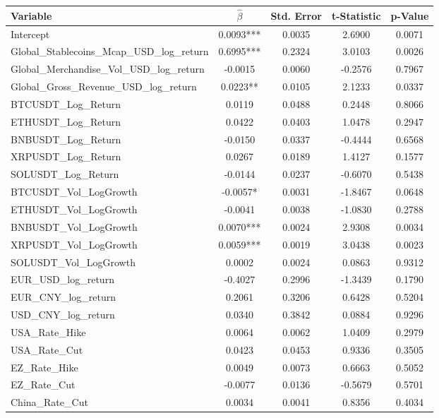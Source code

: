 {\renewcommand{\arraystretch}{0.90}
\begin{tabular}{lcccc}
  \toprule
  \textbf{Variable} & \textbf{$\hat{\beta}$} & \textbf{Std. Error} & \textbf{t-Statistic} & \textbf{p-Value} \\ 
  \midrule
  Intercept & 0.0093*** & 0.0035 & 2.6900 & 0.0071 \\ 
  Global\_Stablecoins\_Mcap\_USD\_log\_return & 0.6995*** & 0.2324 & 3.0103 & 0.0026 \\ 
  Global\_Merchandise\_Vol\_USD\_log\_return & -0.0015 & 0.0060 & -0.2576 & 0.7967 \\ 
  Global\_Gross\_Revenue\_USD\_log\_return & 0.0223** & 0.0105 & 2.1233 & 0.0337 \\ 
  BTCUSDT\_Log\_Return & 0.0119 & 0.0488 & 0.2448 & 0.8066 \\ 
  ETHUSDT\_Log\_Return & 0.0422 & 0.0403 & 1.0478 & 0.2947 \\ 
  BNBUSDT\_Log\_Return & -0.0150 & 0.0337 & -0.4444 & 0.6568 \\ 
  XRPUSDT\_Log\_Return & 0.0267 & 0.0189 & 1.4127 & 0.1577 \\ 
  SOLUSDT\_Log\_Return & -0.0144 & 0.0237 & -0.6070 & 0.5438 \\ 
  BTCUSDT\_Vol\_LogGrowth & -0.0057* & 0.0031 & -1.8467 & 0.0648 \\ 
  ETHUSDT\_Vol\_LogGrowth & -0.0041 & 0.0038 & -1.0830 & 0.2788 \\ 
  BNBUSDT\_Vol\_LogGrowth & 0.0070*** & 0.0024 & 2.9308 & 0.0034 \\ 
  XRPUSDT\_Vol\_LogGrowth & 0.0059*** & 0.0019 & 3.0438 & 0.0023 \\ 
  SOLUSDT\_Vol\_LogGrowth & 0.0002 & 0.0024 & 0.0863 & 0.9312 \\ 
  EUR\_USD\_log\_return & -0.4027 & 0.2996 & -1.3439 & 0.1790 \\ 
  EUR\_CNY\_log\_return & 0.2061 & 0.3206 & 0.6428 & 0.5204 \\ 
  USD\_CNY\_log\_return & 0.0340 & 0.3842 & 0.0884 & 0.9296 \\ 
  USA\_Rate\_Hike & 0.0064 & 0.0062 & 1.0409 & 0.2979 \\ 
  USA\_Rate\_Cut & 0.0423 & 0.0453 & 0.9336 & 0.3505 \\ 
  EZ\_Rate\_Hike & 0.0049 & 0.0073 & 0.6663 & 0.5052 \\ 
  EZ\_Rate\_Cut & -0.0077 & 0.0136 & -0.5679 & 0.5701 \\ 
  China\_Rate\_Cut & 0.0034 & 0.0041 & 0.8356 & 0.4034 \\ 

\end{tabular}}
